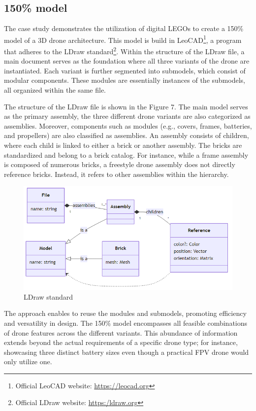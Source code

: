 \documentclass[sigconf,review]{acmart}
\begin{document}
\subsection{150\% model}
\label{sec:150-model}

The case study demonstrates the utilization of digital LEGOs to create a 150\% model of a 3D drone architecture. 
This model is build in LeoCAD\footnote{Official LeoCAD website: \url{https://leocad.org}}, a program that adheres to the LDraw standard\footnote{Official LDraw website: \url{https:/ldraw.org}}. 
Within the structure of the LDraw file, a main document serves as the foundation where all three variants of the drone are instantiated. 
Each variant is further segmented into submodels, which consist of modular components. 
These modules are essentially instances of the submodels, all organized within the same file.

The structure of the LDraw file is shown in the Figure 7. 
The main model serves as the primary assembly, the three different drone variants are also categorized as assemblies. 
Moreover, components such as modules (e.g., covers, frames, batteries, and propellers) are also classified as assemblies. 
An assembly consists of children, where each child is linked to either a brick or another assembly. 
The bricks are standardized and belong to a brick catalog. 
For instance, while a frame assembly is composed of numerous bricks, a freestyle drone assembly does not directly reference bricks. 
Instead, it refers to other assemblies within the hierarchy.

\begin{figure}[htbp]
    \includegraphics[width=\columnwidth]{./ldraw-standard.png}
    \caption{LDraw standard}
    \label{fig:ldraw-standard}
\end{figure}

The approach enables to reuse the modules and submodels, promoting efficiency and versatility in design. 
The 150\% model encompasses all feasible combinations of drone features across the different variants. 
This abundance of information extends beyond the actual requirements of a specific drone type; for instance, showcasing three distinct battery sizes even though a practical FPV drone would only utilize one.
\end{document}
